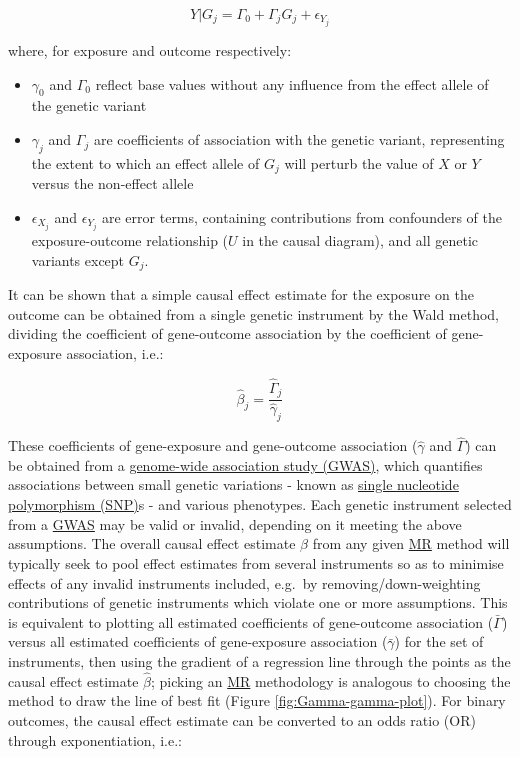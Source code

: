 \documentclass[
]{article}
\providecommand{\tightlist}{%
  \setlength{\itemsep}{0pt}\setlength{\parskip}{0pt}}
\begin{document}
\begin{equation} 
Y|G_j = \Gamma_0 + \Gamma_j G_j + \epsilon_{Y_j}
\end{equation}

where, for exposure and outcome respectively:

\begin{itemize}
\tightlist
\item
  \(\gamma_0\) and \(\Gamma_0\) reflect base values without any influence from the effect allele of the genetic variant
\item
  \(\gamma_j\) and \(\Gamma_j\) are coefficients of association with the genetic variant, representing the extent to which an effect allele of \(G_j\) will perturb the value of \(X\) or \(Y\) versus the non-effect allele
\item
  \(\epsilon_{X_j}\) and \(\epsilon_{Y_j}\) are error terms, containing contributions from confounders of the exposure-outcome relationship (\(U\) in the causal diagram), and all genetic variants except \(G_j\).
\end{itemize}

It can be shown that a simple causal effect estimate for the exposure on the outcome can be obtained from a single genetic instrument by the Wald method, dividing the coefficient of gene-outcome association by the coefficient of gene-exposure association, i.e.:

\begin{equation} 
\hat{\beta}_j = \frac {\hat{\Gamma}_j} {\hat{\gamma}_j}
\end{equation}

These coefficients of gene-exposure and gene-outcome association (\(\hat{\gamma}\) and \(\hat{\Gamma}\)) can be obtained from a \hyperref[acronyms_GWAS]{genome-wide association study (GWAS)}, which quantifies associations between small genetic variations - known as \hyperref[acronyms_SNP]{single nucleotide polymorphism (SNP)}s - and various phenotypes. Each genetic instrument selected from a \hyperref[acronyms_GWAS]{GWAS} may be valid or invalid, depending on it meeting the above assumptions. The overall causal effect estimate \(\hat{\beta}\) from any given \hyperref[acronyms_MR]{MR} method will typically seek to pool effect estimates from several instruments so as to minimise effects of any invalid instruments included, e.g.~by removing/down-weighting contributions of genetic instruments which violate one or more assumptions. This is equivalent to plotting all estimated coefficients of gene-outcome association (\(\bar{\Gamma}\)) versus all estimated coefficients of gene-exposure association (\(\bar{\gamma}\)) for the set of instruments, then using the gradient of a regression line through the points as the causal effect estimate \(\hat{\beta}\); picking an \hyperref[acronyms_MR]{MR} methodology is analogous to choosing the method to draw the line of best fit (Figure \ref{fig:Gamma-gamma-plot}). For binary outcomes, the causal effect estimate can be converted to an odds ratio (OR) through exponentiation, i.e.:
\end{document}
